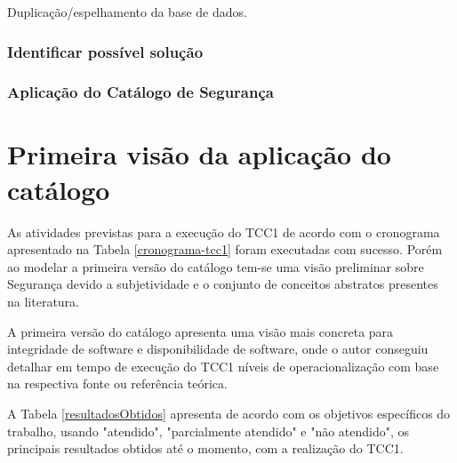 Duplicação/espelhamento da base de dados. 

\subsubsection{Identificar possível solução}

\subsubsection{Aplicação do Catálogo de Segurança}

\section{Primeira visão da aplicação do catálogo}
\label{sec: aplicacaoDoCatalogo}
As atividades previstas para a execução do TCC1 de acordo com o cronograma apresentado na Tabela \ref{cronograma-tcc1} foram executadas com sucesso. Porém ao modelar a primeira versão do catálogo tem-se uma visão preliminar sobre Segurança devido a subjetividade e o conjunto de conceitos abstratos presentes na literatura.

A primeira versão do catálogo apresenta uma visão mais concreta para integridade de software e disponibilidade de software, onde o autor conseguiu detalhar em tempo de execução do TCC1 níveis de operacionalização com base na respectiva fonte ou referência teórica.

A Tabela \ref{resultadosObtidos} apresenta de acordo com os objetivos específicos do trabalho, usando "atendido", "parcialmente atendido" e "não atendido", os principais resultados obtidos até o momento, com a realização do TCC1.

